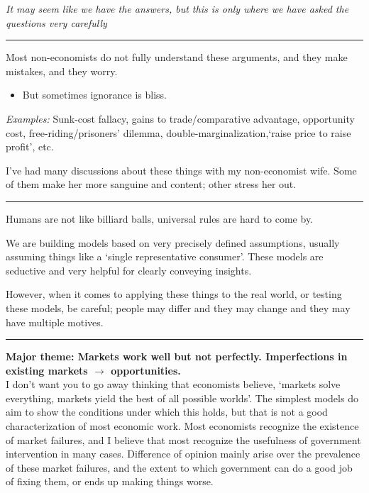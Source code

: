 \documentclass[]{article}
\providecommand{\tightlist}{%
  \setlength{\itemsep}{0pt}\setlength{\parskip}{0pt}}
\begin{document}
\emph{It may seem like we have the answers, but this is only where we
have asked the questions very carefully}

\begin{center}\rule{0.5\linewidth}{\linethickness}\end{center}

\textrm{Most non-economists do not fully understand these arguments, and they make mistakes, and they worry.}

\begin{itemize}
\tightlist
\item
  But sometimes ignorance is bliss.
\end{itemize}

\emph{Examples:} Sunk-cost fallacy, gains to trade/comparative
advantage, opportunity cost, free-riding/prisoners' dilemma,
double-marginalization,`raise price to raise profit', etc.

I've had many discussions about these things with my non-economist wife.
Some of them make her more sanguine and content; other stress her out.

\begin{center}\rule{0.5\linewidth}{\linethickness}\end{center}

\textrm{Humans are not like billiard balls, universal rules are hard to come by.}

We are building models based on very precisely defined assumptions,
usually assuming things like a `single representative consumer'. These
models are seductive and very helpful for clearly conveying insights.

However, when it comes to applying these things to the real world, or
testing these models, be careful; people may differ and they may change
and they may have multiple motives.

\begin{center}\rule{0.5\linewidth}{\linethickness}\end{center}

\textbf{Major theme: Markets work well but not perfectly. Imperfections
in existing markets \(\rightarrow\) opportunities.}\\

I don't want you to go away thinking that economists believe, `markets
solve everything, markets yield the best of all possible worlds'. The
simplest models do aim to show the conditions under which this holds,
but that is not a good characterization of most economic work. Most
economists recognize the existence of market failures, and I believe
that most recognize the usefulness of government intervention in many
cases. Difference of opinion mainly arise over the prevalence of these
market failures, and the extent to which government can do a good job of
fixing them, or ends up making things worse.
\end{document}
